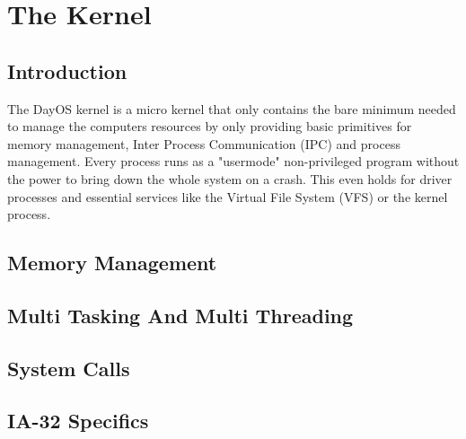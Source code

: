 \chapter{The Kernel}

\section{Introduction}
The DayOS kernel is a micro kernel that only contains the bare minimum needed to manage the
computers resources by only providing basic primitives for memory management, Inter
Process Communication (IPC) and process management.
Every process runs as a "usermode" non-privileged program without the power to bring down the whole system
on a crash. This even holds for driver processes and essential services like the 
Virtual File System (VFS) or the kernel process.

\section{Memory Management}
\section{Multi Tasking And Multi Threading}
\section{System Calls}

\section{IA-32 Specifics}
